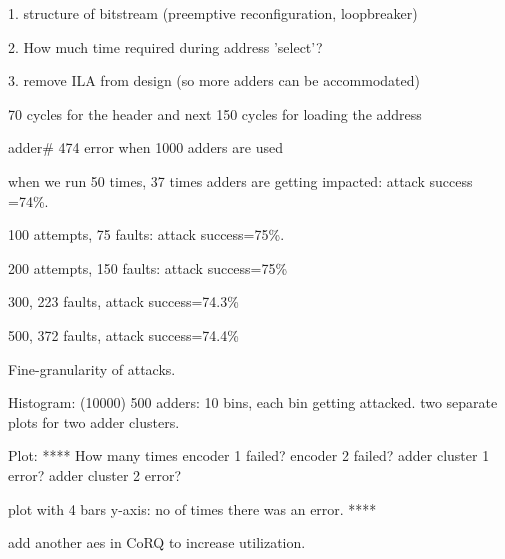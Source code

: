 1. structure of bitstream (preemptive reconfiguration, loopbreaker)

2. How much time required during address 'select'?

3. remove ILA from design (so more adders can be accommodated)

70 cycles for the header and next 150 cycles for loading the address



adder# 474 error when 1000 adders are used

when we run 50 times, 37 times adders are getting impacted: attack success =74\%.

100 attempts, 75 faults: attack success=75\%.

200 attempts, 150 faults: attack success=75\%

300, 223 faults, attack success=74.3\%

500, 372 faults, attack success=74.4\%


 Fine-granularity of attacks.

Histogram: (10000)
500 adders: 10 bins, each bin getting attacked. two separate plots for two adder clusters.


Plot:
****
How many times encoder 1 failed?
encoder 2 failed?
adder cluster 1 error?
adder cluster 2 error?

plot with 4 bars 
y-axis: no of times there was an error.
****


add another aes in CoRQ to increase utilization.



 